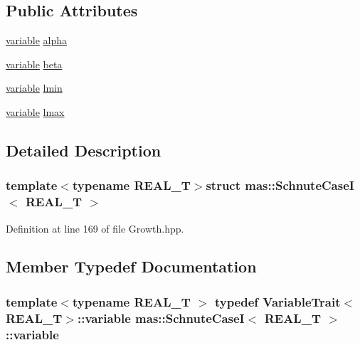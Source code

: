 \subsection*{Public Attributes}
\begin{DoxyCompactItemize}
\item 
\hyperlink{structmas_1_1_schnute_case_i_a6655933b5cf46aabdff359c07c095a95}{variable} \hyperlink{structmas_1_1_schnute_case_i_a65872d07f8ecb249f7eecc7d167d8393}{alpha}
\item 
\hyperlink{structmas_1_1_schnute_case_i_a6655933b5cf46aabdff359c07c095a95}{variable} \hyperlink{structmas_1_1_schnute_case_i_a375472b1c6d9a60992aba819d54b4ece}{beta}
\item 
\hyperlink{structmas_1_1_schnute_case_i_a6655933b5cf46aabdff359c07c095a95}{variable} \hyperlink{structmas_1_1_schnute_case_i_a36282ecc11a1baa5c47a31d9419853a0}{lmin}
\item 
\hyperlink{structmas_1_1_schnute_case_i_a6655933b5cf46aabdff359c07c095a95}{variable} \hyperlink{structmas_1_1_schnute_case_i_ac393da368b9ab41438b697d78b700ee7}{lmax}
\end{DoxyCompactItemize}


\subsection{Detailed Description}
\subsubsection*{template$<$typename R\-E\-A\-L\-\_\-\-T$>$struct mas\-::\-Schnute\-Case\-I$<$ R\-E\-A\-L\-\_\-\-T $>$}



Definition at line 169 of file Growth.\-hpp.



\subsection{Member Typedef Documentation}
\hypertarget{structmas_1_1_schnute_case_i_a6655933b5cf46aabdff359c07c095a95}{
\subsubsection[{variable}]{\setlength{\rightskip}{0pt plus 5cm}template$<$typename R\-E\-A\-L\-\_\-\-T $>$ typedef {\bf Variable\-Trait}$<$R\-E\-A\-L\-\_\-\-T$>$\-::{\bf variable} {\bf mas\-::\-Schnute\-Case\-I}$<$ R\-E\-A\-L\-\_\-\-T $>$\-::{\bf variable}}}\label{structmas_1_1_schnute_case_i_a6655933b5cf46aabdff359c07c095a95}


